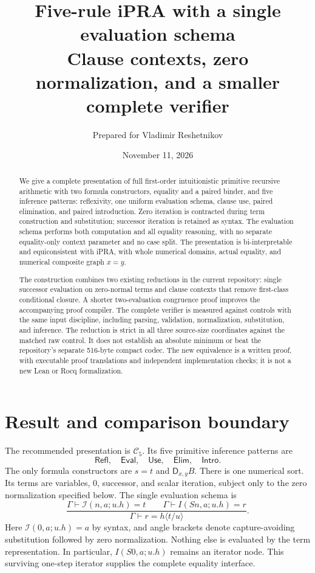 \documentclass[11pt]{article}
\title{\textbf{Five-rule iPRA with a single evaluation schema}\\[5pt]
\large Clause contexts, zero normalization, and a smaller complete verifier}
\author{Prepared for Vladimir Reshetnikov}
\date{November 11, 2026}
\theoremstyle{definition}
\newcommand{\C}{\mathcal C_5}
\newcommand{\si}{\mathcal I}
\newcommand{\UE}{\mathsf{Eval}}
\newcommand{\RF}{\mathsf{Refl}}
\newcommand{\D}{\mathsf D}
\begin{document}
\maketitle
\begin{abstract}
We give a complete presentation of full first-order intuitionistic primitive
recursive arithmetic with two formula constructors, equality and a paired
binder, and five inference patterns: reflexivity, one uniform evaluation
schema, clause use, paired elimination, and paired introduction. Zero
iteration is contracted during term construction and substitution; successor
iteration is retained as syntax. The evaluation schema performs both
computation and all equality reasoning, with no separate equality-only
context parameter and no case split. The presentation is bi-interpretable and equiconsistent
with iPRA, with whole numerical domains, actual equality, and numerical
composite graph $x=y$.

The construction combines two existing reductions in the current repository:
single successor evaluation on zero-normal terms and clause contexts that
remove first-class conditional closure. A shorter two-evaluation congruence
proof improves the accompanying proof compiler. The complete verifier is
measured against controls with the same input discipline, including parsing,
validation, normalization, substitution, and inference. The reduction is
strict in all three source-size coordinates against the matched raw control.
It does not establish an absolute minimum or beat the repository's separate
516-byte compact codec. The new equivalence is a written proof, with
executable proof translations and independent implementation checks; it is
not a new Lean or Rocq formalization.
\end{abstract}
\clearpage
\tableofcontents
\newpage

\section{Result and comparison boundary}

The recommended presentation is $\C$. Its five primitive inference patterns
are
\[
\boxed{\RF,\quad\UE,\quad\mathsf{Use},\quad\mathsf{Elim},\quad\mathsf{Intro}.}
\]
The only formula constructors are $s=t$ and $\D_{x,y}B$. There is one
numerical sort. Its terms are variables, $0$, successor, and scalar iteration,
subject only to the zero normalization specified below. The single
evaluation schema is
\[
\frac{\Gamma\vdash\si(n,a;u.h)=t\qquad
      \Gamma\vdash I(Sn,a;u.h)=r}
     {\Gamma\vdash r=h\langle t/u\rangle}.
\tag{Eval}\label{eq:main-eval}
\]
Here $\si(0,a;u.h)=a$ by syntax, and angle brackets denote capture-avoiding
substitution followed by zero normalization. Nothing else is evaluated by
the term representation. In particular, $I(S0,a;u.h)$ remains an iterator
node. This surviving one-step iterator supplies the complete equality
interface.
\end{document}
